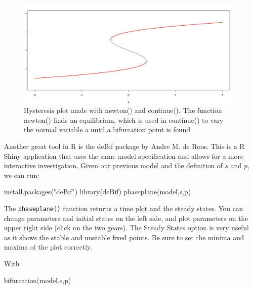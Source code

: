 \documentclass[
  a4paper,
  DIV=11,
  numbers=noendperiod,
  oneside]{scrreprt}
\newenvironment{Shaded}{\begin{snugshade}}{\end{snugshade}}
\newcommand{\FunctionTok}[1]{\textcolor[rgb]{0.28,0.35,0.67}{#1}}
\newcommand{\NormalTok}[1]{\textcolor[rgb]{0.00,0.23,0.31}{#1}}
\newcommand{\StringTok}[1]{\textcolor[rgb]{0.13,0.47,0.30}{#1}}
\begin{document}
\begin{figure}

{\centering \includegraphics{media/ch4n/image3.jpg}

}

\caption{\label{fig-ch4n-img3-old-51}Hysteresis plot made with newton()
and continue(). The function newton() finds an equilibrium, which is
used in continue() to vary the normal variable a until a bifurcation
point is found}

\end{figure}

Another great tool in R is the deBif package by Andre M. de Roos. This
is a R Shiny application that uses the same model specification and
allows for a more interactive investigation. Given our previous model
and the definition of \(s\) and \(p\), we can run:

\begin{Shaded}
\begin{Highlighting}[]
\FunctionTok{install.packages}\NormalTok{(}\StringTok{"deBif"}\NormalTok{)}
\FunctionTok{library}\NormalTok{(deBif)}
\FunctionTok{phaseplane}\NormalTok{(model,s,p)}
\end{Highlighting}
\end{Shaded}

The \texttt{phaseplane()} function returns a time plot and the steady
states. You can change parameters and initial states on the left side,
and plot parameters on the upper right side (click on the two gears).
The Steady States option is very useful as it shows the stable and
unstable fixed points. Be sure to set the minima and maxima of the plot
correctly.

With

\begin{Shaded}
\begin{Highlighting}[]
\FunctionTok{bifurcation}\NormalTok{(model,s,p)}
\end{Highlighting}
\end{Shaded}
\end{document}
